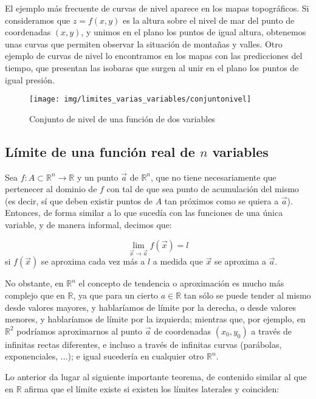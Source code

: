 El ejemplo más frecuente de curvas de nivel aparece en los mapas
topográficos. Si consideramos que $z=f(x,y)$ es la altura sobre el
nivel de mar del punto de coordenadas $(x,y)$, y unimos en el
plano los puntos de igual altura, obtenemos unas curvas que
permiten observar la situación de montañas y valles. Otro ejemplo
de curvas de nivel lo encontramos en los mapas con las
predicciones del tiempo, que presentan las isobaras que surgen al
unir en el plano los puntos de igual presión.

\begin{figure}[h!]
\begin{center}
\texttt{[image: img/limites\_varias\_variables/conjuntonivel]}
\caption{Conjunto de nivel de una función de dos variables}
\end{center}
\end{figure}


\subsection*{Límite de una función real de $n$ variables}

Sea $f: A \subset \mathbb{R}^n  \to \mathbb{R}$ y un punto $\vec
a$ de $\mathbb R^n$, que no tiene necesariamente que pertenecer al
dominio de $f$ con tal de que sea punto de acumulación del mismo
(es decir, sí que deben existir puntos de $A$ tan próximos como se
quiera a $\vec a$). Entonces, de forma similar a lo que sucedía
con las funciones de una única variable, y de manera informal,
decimos que:

\[
\mathop {\lim }\limits_{\vec x \to \vec a} f\left( {\vec x}
\right)=l
\]
si $f\left( {\vec x} \right)$ se aproxima cada vez más a $l$ a
medida que $\vec x$ se aproxima a $\vec a$.

No obstante, en $\mathbb R^n$ el concepto de tendencia o
aproximación es mucho más complejo que en $\mathbb R$, ya que para
un cierto $a \in \mathbb R$ tan sólo se puede tender al mismo
desde valores mayores, y hablaríamos de límite por la derecha, o
desde valores menores, y hablaríamos de límite por la izquierda;
mientras que, por ejemplo, en $\mathbb R^2$ podríamos aproximarnos
al punto $\vec a$ de coordenadas $(x_0,y_0)$ a través de infinitas
rectas diferentes, e incluso a través de infinitas curvas
(parábolas, exponenciales, ...); e igual sucedería en cualquier
otro $\mathbb R^n$.

Lo anterior da lugar al siguiente importante teorema, de contenido
similar al que en $\mathbb R$ afirma que el límite existe si
existen los límites laterales y coinciden:


